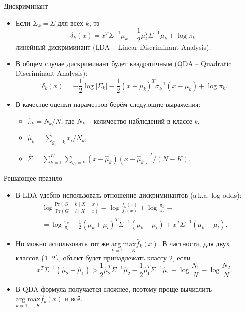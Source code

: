 \documentclass[9pt]{beamer}
\begin{document}
\begin{frame}{Дискриминант}
\begin{itemize}
    \item Если $\Sigma_k = \Sigma$ для всех $k$, то
    $$\delta_k(x) = x^T\Sigma^{-1}\mu_k -\frac{1}{2}\mu_k^T\Sigma^{-1}\mu_k + 
    \log\pi_k \text{--}$$
    линейный дискриминант (LDA -- Linear Discriminant Analysis).
    \item В общем случае дискриминант будет квадратичным (QDA -- Quadratic Discriminant Analysis):
    $$\delta_k(x) = -\frac{1}{2}\log |\Sigma_k| -\frac{1}{2}(x-\mu_k)^T\sigma_k^{-1}(x-\mu_k) + \log\pi_k.$$
    \item В качестве оценки параметров берём следующие выражения:
    \begin{itemize}
        \item $\hat \pi_k = N_k/N$, где $N_k$ -- количество наблюдений в классе $k$,
        \item $\hat \mu_k = \sum_{g_i = k}x_i / N_k$,
        \item $\hat \Sigma = \sum_{k=1}^K\sum_{g_i = k} (x-\hat\mu_k)(x-\hat\mu_k)^T/(N-K)$.
    \end{itemize}
\end{itemize}
\end{frame}

\begin{frame}{Решающее правило}
    \begin{itemize}
        \item В LDA удобно использовать отношение дискриминантов (a.k.a. log-odds):
        \begin{equation*}
        \begin{split}
            \log \frac{\text{Pr}(G=k \;|\; X = x)}{\text{Pr}(G=l \;|\; X = x)} = \log \frac{f_k(x)}{f_l(x)} + \log \frac{\pi_k}{\pi_l} = \\
            = \log \frac{\pi_k}{\pi_l} - \frac{1}{2}(\mu_k + \mu_l)^T\Sigma^{-1}(\mu_k-\mu_l) + x^T\Sigma^{-1}(\mu_k - \mu_l).
        \end{split}
        \end{equation*}
        \item Но можно использовать тот же $\underset{k=1,\ldots,K}{\mathrm{arg\;max}}\hat f_k(x)$. В частности, для двух классов \{1, 2\}, объект будет принадлежать классу 2, если
        $$x^T\Sigma^{-1}(\hat\mu_2-\hat\mu_1) > \frac{1}{2}\hat\mu_2^T\Sigma^{-1}\hat\mu_2 - \frac{1}{2}\hat\mu_1^T\Sigma^{-1}\hat\mu_1 + \log \frac{N_1}{N} - \log\frac{N_2}{N}.$$
        \item В QDA формула получается сложнее, поэтому проще вычислить $\underset{k=1,\ldots,K}{\mathrm{arg\;max}}\hat f_k(x)$ и всё.
    \end{itemize}
\end{frame}
\end{document}
